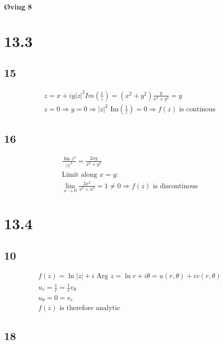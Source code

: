 \begin{center}
	\LARGE{\textbf{Øving 8}}
\end{center}


\section*{13.3}

\subsection*{15}


\begin{gather*}
	z = x + i y
	|z|^2 Im \left(\frac{1}{z}\right)
	=
	\left(x^2 + y^2\right) \frac{y}{x^2 + y^2}
	=
	y
	\\
	z = 0 \Rightarrow y = 0 \Rightarrow |z|^2 \text{ Im} \left(\frac{1}{z}\right) = 0
	\Rightarrow f(z) \text{ is continous}
\end{gather*}


\subsection*{16}


\begin{gather*}
	\frac{\text{ Im } z^2}{|z|^2}
	=
	\frac{2 x y}{x^2 + y^2}
	\\
	\text{Limit along } x = y:
	\\
	\lim_{x \rightarrow 0}{\frac{2 x^2}{x^2 + x^2}}
	=
	1 \neq 0 \Rightarrow f(z) \text{ is discontinous}
\end{gather*}


\section*{13.4}

\subsection*{10}


\begin{gather*}
	f(z) = \ln{|z|} + i \text{ Arg } z = \ln{r} + i \theta = u(r, \theta) + i v(r, \theta)
	\\
	u_r = \frac{1}{r} = \frac{1}{r} v_\theta
	\\
	u_\theta = 0 = v_r
	\\
	f(z) \text{ is therefore analytic}
\end{gather*}


\subsection*{18}


